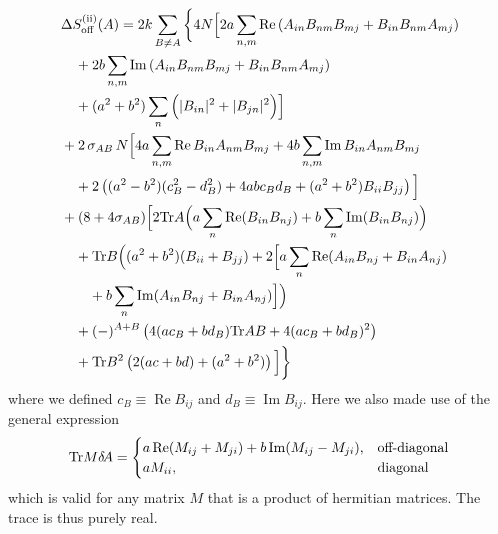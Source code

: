 \documentclass[10pt,a4paper]{article}
\newcommand{\RN}[1]{%
    \textup{\uppercase\expandafter{\romannumeral#1}}%
}
\newcommand{\Tr}{\mathrm{Tr}\vspace{-2pt}}
\newcommand{\deltaA}{\delta \! A}
\begin{document}
\begin{align}
  &\Delta S^{(\RN{2})}_{\mathrm{off}} (A) =
  2k \sum_{B \neq A} \bigg\{ 4N \Big[
      2a \sum_{n,m} \operatorname{Re}
      \left( A_{in} B_{nm} B_{mj} + B_{in} B_{nm} A_{mj} \right)\\
      &\quad+ 2b \sum_{n,m} \operatorname{Im}
      \left( A_{in} B_{nm} B_{mj} + B_{in} B_{nm} A_{mj} \right)\\
      &\quad+ (a^2 + b^2) \sum_n \Big( |B_{in}|^2 + |B_{jn}|^2 \Big)
  \Big]\\
  &+ 2 \,  \sigma_{AB} \, N   \Big[
    4a \sum_{n,m} \operatorname{Re} B_{in} A_{nm} B_{mj}
    +4b \sum_{n,m} \operatorname{Im} B_{in} A_{nm} B_{mj} \\
    &\quad+
    2 \left(
      (a^2-b^2)(c_B^2-d_B^2) + 4abc_B d_B + (a^2+b^2) B_{ii} B_{jj}
    \right)
  \Big]\\
  &+ (8+4\sigma_{AB}) \Big[
    2 \Tr A \Big(
      a \sum_n \operatorname{Re} (B_{in} B_{nj})
      +b \sum_n \operatorname{Im} (B_{in} B_{nj})
          \Big) \\
    &\quad+ \Tr B \Big(
      (a^2+b^2)(B_{ii}+B_{jj}) + 2 \Big[
        a \sum_n \operatorname{Re} (A_{in} B_{nj} + B_{in} A_{nj}) \\
        &\quad\quad+b \sum_n \operatorname{Im} (A_{in} B_{nj} + B_{in} A_{nj})
      \Big] \Big) \\
      &\quad+ (-)^{A+B} \left(
       4 (ac_B+bd_B) \Tr AB + 4(ac_B+bd_B)^2
     \right) \\
   &\quad+ \Tr B^2 \left( 2(ac+bd)+(a^2+b^2) \right)
  \Big]
 \bigg\}
\end{align}
where we defined $c_B \equiv \operatorname{Re} B_{ij}$ and
$d_B \equiv \operatorname{Im} B_{ij}$.
Here we also made use of the general expression
\begin{align}
  \Tr M \deltaA =
  \begin{cases}
    a \operatorname{Re} (M_{ij} + M_{ji})
    +b \operatorname{Im} (M_{ij} - M_{ji}), &\text{off-diagonal}\\
    a M_{ii}, &\text{diagonal}
  \end{cases}
\end{align}
which is valid for any matrix $M$ that is a product of hermitian matrices.
The trace is thus purely real.
\end{document}
